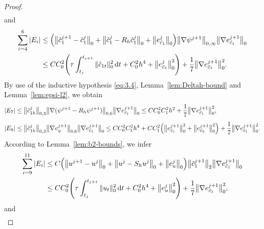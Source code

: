 \documentclass[a4paper,fleqn]{cas-sc}
\numberwithin{equation}{section}
\theoremstyle{definition}
\begin{document}
\begin{proof}
\begin{align}
  \label{eq:4.12}
\end{align}
and
\begin{align}
  \sum_{i=4}^{6}|E_{i}|
  &\leq \Bigl(\bigl\|\tilde{c}_{1}^{j+1}-\tilde{c}_{1}^{j}\bigr\|_{0}
             + \bigl\|\tilde{c}_{1}^{j} - R_{h}\tilde{c}_{1}^{j}\bigr\|_{0}
             + \bigl\|e_{\tilde{c}_{1}}^{j}\bigr\|_{0}\Bigr)
    \bigl\|\nabla\psi^{j+1}\bigr\|_{0,\infty}
    \bigl\|\nabla e_{\tilde{c}_{1}}^{j+1}\bigr\|_{0}
  \nonumber\\
  &\leq CC_{0}^{2}\!\left(\tau\int_{t_{j}}^{t_{j+1}}\|\tilde{c}_{1t}\|_{0}^{2}\,\mathrm{d}t
    + C_{0}^{2}h^{4}
    + \bigl\|e_{\tilde{c}_{1}}^{j}\bigr\|_{0}^{2}\right)
   + \frac{1}{7}\bigl\|\nabla e_{\tilde{c}_{1}}^{j+1}\bigr\|_{0}^{2}.
  \label{eq:4.13}
\end{align}
By use of the inductive hypothesis \eqref{eq:3.4}, Lemma~\ref{lem:Deltah-bound} and
Lemma~\ref{lem:epsi-l2}, we obtain
\begin{align}
  |E_{7}|
  &\leq \bigl\|\tilde{c}_{1h}^{j}\bigr\|_{0,3}
         \bigl\|\nabla(\psi^{j+1} - R_{h}\psi^{j+1})\bigr\|_{0,6}
         \bigl\|\nabla e_{\tilde{c}_{1}}^{j+1}\bigr\|_{0}
  \leq CC_{0}^{2}C_{1}^{2}h^{2}
       + \frac{1}{7}\bigl\|\nabla e_{\tilde{c}_{1}}^{j+1}\bigr\|_{0}^{2},
  \label{eq:4.14}\\[4pt]
  |E_{8}|
  &\leq \bigl\|\tilde{c}_{1h}^{j}\bigr\|_{0,3}
         \bigl\|\nabla e_{\psi}^{j+1}\bigr\|_{0,6}
         \bigl\|\nabla e_{\tilde{c}_{1}}^{j+1}\bigr\|_{0}
  \leq CC_{0}^{2}C_{1}^{2}h^{4}
       + CC_{1}^{2}\Bigl(\bigl\|e_{\tilde{c}_{1}}^{j+1}\bigr\|_{0}^{2}
                         + \bigl\|e_{\tilde{c}_{2}}^{j+1}\bigr\|_{0}^{2}\Bigr)
       + \frac{1}{7}\bigl\|\nabla e_{\tilde{c}_{1}}^{j+1}\bigr\|_{0}^{2}.
  \label{eq:4.15}
\end{align}
According to Lemma~\ref{lem:b2-bounds}, we infer
\begin{align}
  \sum_{i=9}^{11}|E_{i}|
  &\leq C\Bigl(\bigl\|u^{j+1}-u^{j}\bigr\|_{0}
              + \bigl\|u^{j} - S_{h}u^{j}\bigr\|_{0}
              + \bigl\|e_{u}^{j}\bigr\|_{0}\Bigr)
    \bigl\|\tilde{c}_{1}^{j+1}\bigr\|_{2}
    \bigl\|\nabla e_{\tilde{c}_{1}}^{j+1}\bigr\|_{0}
  \nonumber\\
  &\leq CC_{0}^{2}\!\left(\tau\int_{t_{j}}^{t_{j+1}}\|u_{t}\|_{0}^{2}\,\mathrm{d}t
    + C_{0}^{2}h^{4}
    + \bigl\|e_{u}^{j}\bigr\|_{0}^{2}\right)
   + \frac{1}{7}\bigl\|\nabla e_{\tilde{c}_{1}}^{j+1}\bigr\|_{0}^{2},
  \label{eq:4.16}
\end{align}
and
\begin{align}

\end{align}
\end{proof}
\end{document}
